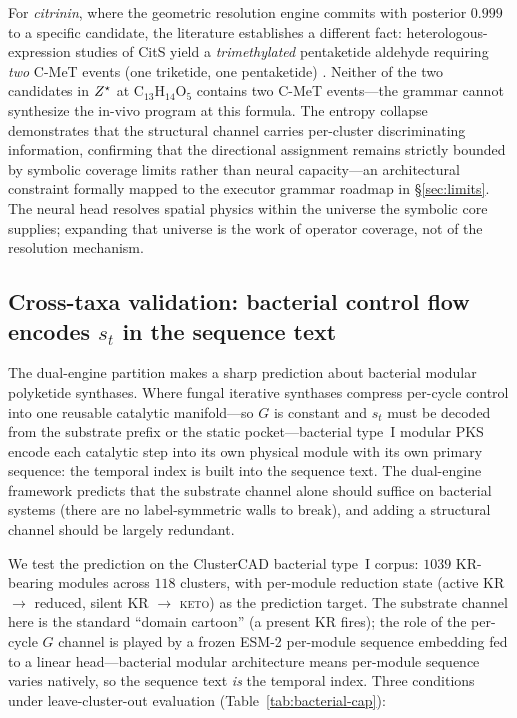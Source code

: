 For \emph{citrinin}, where the geometric resolution engine commits with posterior $0.999$
to a specific candidate, the literature establishes a different fact:
heterologous-expression studies of CitS yield a \emph{trimethylated} pentaketide
aldehyde requiring \emph{two} C-MeT events (one triketide, one pentaketide)
\citep{storm2017citrinin}. Neither of the two candidates in $Z^{\star}$ at
$\mathrm{C}_{13}\mathrm{H}_{14}\mathrm{O}_5$ contains two C-MeT events---the grammar
cannot synthesize the in-vivo program at this formula. The entropy collapse
demonstrates that the structural channel carries per-cluster discriminating
information, confirming that the directional assignment remains strictly bounded
by symbolic coverage limits rather than neural capacity---an architectural
constraint formally mapped to the executor grammar roadmap in
\S\ref{sec:limits}. The neural head resolves spatial physics within the universe
the symbolic core supplies; expanding that universe is the work of operator
coverage, not of the resolution mechanism.

\subsection{Cross-taxa validation: bacterial control flow encodes $s_t$ in the sequence text}
\label{sec:bacterial-cap}

The dual-engine partition makes a sharp prediction about bacterial modular polyketide
synthases. Where fungal iterative synthases compress per-cycle control into one reusable
catalytic manifold---so $G$ is constant and $s_t$ must be decoded from the substrate
prefix or the static pocket---bacterial type~I modular PKS encode each catalytic step
into its own physical module with its own primary sequence: the temporal index is built
into the sequence text. The dual-engine framework predicts that the substrate channel
alone should suffice on bacterial systems (there are no label-symmetric walls to break),
and adding a structural channel should be largely redundant.

We test the prediction on the ClusterCAD bacterial type~I corpus: $1039$ KR-bearing
modules across $118$ clusters, with per-module reduction state (active KR $\to$ reduced,
silent KR $\to$ \textsc{keto}) as the prediction target. The substrate channel here is
the standard ``domain cartoon'' (a present KR fires); the role of the per-cycle $G$
channel is played by a frozen ESM-2 \citep{esm2} per-module sequence embedding fed to
a linear head---bacterial modular architecture means per-module sequence varies natively,
so the sequence text \emph{is} the temporal index. Three conditions under leave-cluster-out
evaluation (Table~\ref{tab:bacterial-cap}):

